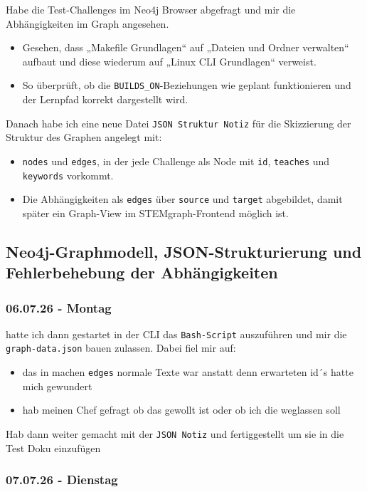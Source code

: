Habe die Test-Challenges im Neo4j Browser abgefragt und mir die Abhängigkeiten im Graph angesehen. 

\begin{itemize}
  \item Gesehen, dass „Makefile Grundlagen“ auf „Dateien und Ordner verwalten“ aufbaut und diese wiederum auf „Linux CLI Grundlagen“ verweist. 
  \item So überprüft, ob die \texttt{BUILDS\_ON}-Beziehungen wie geplant funktionieren und der Lernpfad korrekt dargestellt wird.
\end{itemize}

Danach habe ich eine neue Datei \texttt{JSON Struktur Notiz} für die Skizzierung der Struktur des Graphen angelegt mit:

\begin{itemize}
  \item \texttt{nodes} und \texttt{edges}, in der jede Challenge als Node mit \texttt{id}, \texttt{teaches} und \texttt{keywords} vorkommt.
  \item Die Abhängigkeiten als \texttt{edges} über \texttt{source} und \texttt{target} abgebildet, damit später ein Graph-View im STEMgraph-Frontend möglich ist.
\end{itemize}

\subsection{Neo4j-Graphmodell, JSON-Strukturierung und Fehlerbehebung der Abhängigkeiten}
\subsubsection{06.07.26 - Montag}

hatte ich dann gestartet in der CLI das \texttt{Bash-Script} auszuführen und mir die \texttt{graph-data.json} bauen zulassen. Dabei fiel mir auf:

\begin{itemize}
  \item das in machen \texttt{edges} normale Texte war anstatt denn erwarteten id´s hatte mich gewundert
  \item hab meinen Chef gefragt ob das gewollt ist oder ob ich die weglassen soll 
\end{itemize}

Hab dann weiter gemacht mit der \texttt{JSON Notiz} und fertiggestellt um sie in die Test Doku einzufügen

\subsubsection{07.07.26 - Dienstag}

